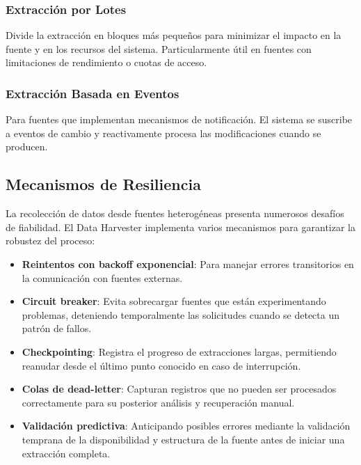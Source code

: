 \documentclass[12pt,a4paper]{article}
\begin{document}
\subsubsection{Extracción por Lotes}
Divide la extracción en bloques más pequeños para minimizar el impacto en la fuente y en los recursos del sistema. Particularmente útil en fuentes con limitaciones de rendimiento o cuotas de acceso.

\subsubsection{Extracción Basada en Eventos}
Para fuentes que implementan mecanismos de notificación. El sistema se suscribe a eventos de cambio y reactivamente procesa las modificaciones cuando se producen.

\subsection{Mecanismos de Resiliencia}
\label{subsec:dh-resiliencia}

La recolección de datos desde fuentes heterogéneas presenta numerosos desafíos de fiabilidad. El Data Harvester implementa varios mecanismos para garantizar la robustez del proceso:

\begin{itemize}
    \item \textbf{Reintentos con backoff exponencial}: Para manejar errores transitorios en la comunicación con fuentes externas.
    
    \item \textbf{Circuit breaker}: Evita sobrecargar fuentes que están experimentando problemas, deteniendo temporalmente las solicitudes cuando se detecta un patrón de fallos.
    
    \item \textbf{Checkpointing}: Registra el progreso de extracciones largas, permitiendo reanudar desde el último punto conocido en caso de interrupción.
    
    \item \textbf{Colas de dead-letter}: Capturan registros que no pueden ser procesados correctamente para su posterior análisis y recuperación manual.
    
    \item \textbf{Validación predictiva}: Anticipando posibles errores mediante la validación temprana de la disponibilidad y estructura de la fuente antes de iniciar una extracción completa.
\end{itemize}
\end{document}
